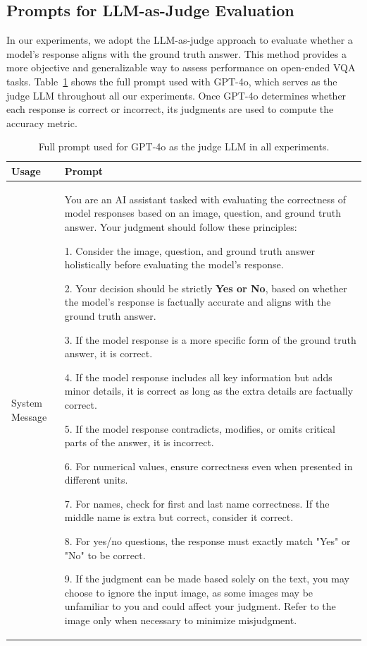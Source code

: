 \documentclass{article}
\begin{document}
\subsection{Prompts for LLM-as-Judge Evaluation}
\label{appendix:eval-prompts}
In our experiments, we adopt the LLM-as-judge approach to evaluate whether a model's response aligns with the ground truth answer. This method provides a more objective and generalizable way to assess performance on open-ended VQA tasks. Table~\ref{tab:eval-prompt} shows the full prompt used with GPT-4o, which serves as the judge LLM throughout all our experiments. Once GPT-4o determines whether each response is correct or incorrect, its judgments are used to compute the accuracy metric.
\begin{table}[t]
\centering
\caption{Full prompt used for GPT-4o as the judge LLM in all experiments.}
\label{tab:eval-prompt}
\begin{tabular}{p{1cm}|p{12cm}}
\toprule
\textbf{Usage} & \textbf{Prompt} \\ \midrule
System Message & You are an AI assistant tasked with evaluating the correctness of model responses based on an image, question, and ground truth answer. Your judgment should follow these principles:

1. Consider the image, question, and ground truth answer holistically before evaluating the model's response.

2. Your decision should be strictly \textbf{Yes or No}, based on whether the model's response is factually accurate and aligns with the ground truth answer.

3. If the model response is a more specific form of the ground truth answer, it is correct.

4. If the model response includes all key information but adds minor details, it is correct as long as the extra details are factually correct.

5. If the model response contradicts, modifies, or omits critical parts of the answer, it is incorrect.

6. For numerical values, ensure correctness even when presented in different units.

7. For names, check for first and last name correctness. If the middle name is extra but correct, consider it correct.

8. For yes/no questions, the response must exactly match "Yes" or "No" to be correct.

9. If the judgment can be made based solely on the text, you may choose to ignore the input image, as some images may be unfamiliar to you and could affect your judgment. Refer to the image only when necessary to minimize misjudgment.


\end{tabular}
\end{table}
\end{document}
